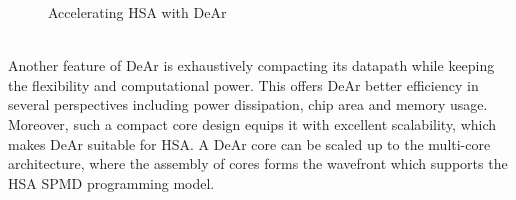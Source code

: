 \begin{figure}[!ht]
    \begin{center}
        \hfill
    \end{center}
    \caption{Accelerating HSA with DeAr}
    \label{fig:bb}
\end{figure}
\\\indent 
Another feature of DeAr is exhaustively compacting its datapath while keeping the flexibility and computational power.
This offers DeAr better efficiency in several perspectives including power dissipation, chip area and memory usage.
Moreover, such a compact core design equips it with excellent scalability, 
which makes DeAr suitable for HSA.
A DeAr core can be scaled up to the multi-core architecture, 
where the assembly of cores forms the wavefront which supports the HSA SPMD programming model.
